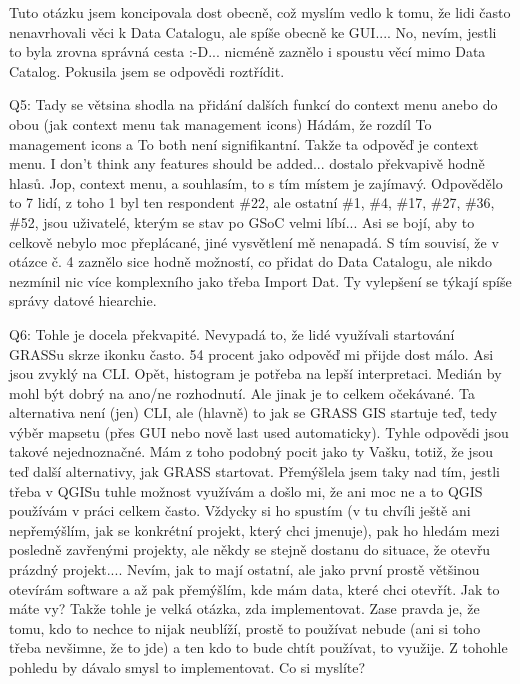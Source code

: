 \documentclass[a4paper,10pt,twoside]{article}
\begin{document}
 Tuto otázku jsem koncipovala dost obecně, což myslím vedlo k tomu, že lidi často nenavrhovali věci k Data Catalogu, ale spíše obecně ke GUI.... No, nevím, jestli to byla zrovna správná cesta :-D... nicméně zaznělo i spoustu věcí mimo Data Catalog. Pokusila jsem se odpovědi roztřídit.

    Q5: Tady se větsina shodla na přidání dalších funkcí do context menu anebo do obou (jak context menu tak management icons)
Hádám, že rozdíl To management icons a To both není signifikantní. Takže ta odpověď je context menu. I don't think any features should be added... dostalo překvapivě hodně hlasů.
Jop, context menu, a souhlasím, to s tím místem je zajímavý. Odpovědělo to 7 lidí, z toho 1 byl ten respondent \#22, ale ostatní \#1, \#4, \#17, \#27, \#36, \#52, jsou uživatelé, kterým se stav po GSoC velmi líbí... Asi se bojí, aby to celkově nebylo moc přeplácané, jiné vysvětlení mě nenapadá. S tím souvisí, že v otázce č. 4  zaznělo sice hodně možností, co přidat do Data Catalogu, ale nikdo nezmínil nic více komplexního jako třeba Import Dat. Ty vylepšení se týkají spíše správy datové hiearchie.

    Q6: Tohle je docela překvapité. Nevypadá to, že lidé využívali startování GRASSu skrze ikonku často. 54 procent jako odpověď mi přijde dost málo. Asi jsou zvyklý na CLI.
    Opět, histogram je potřeba na lepší interpretaci. Medián by mohl být dobrý na ano/ne rozhodnutí. Ale jinak je to celkem očekávané.
    Ta alternativa není (jen) CLI, ale (hlavně) to jak se GRASS GIS startuje teď, tedy výběr mapsetu (přes GUI nebo nově last used automaticky).
    Tyhle odpovědi jsou takové nejednoznačné. Mám z toho podobný pocit jako ty Vašku, totiž, že jsou teď další alternativy, jak GRASS startovat. Přemýšlela jsem taky nad tím, jestli třeba v QGISu tuhle možnost využívám a došlo mi, že ani moc ne a to QGIS používám v práci celkem často. Vždycky si ho spustím (v tu chvíli ještě ani nepřemýšlím, jak se konkrétní projekt, který chci jmenuje), pak ho hledám mezi posledně zavřenými projekty, ale někdy se stejně dostanu do situace, že otevřu prázdný projekt.... Nevím, jak to mají ostatní, ale jako první prostě většinou otevírám software a až pak přemýšlím, kde mám data, které chci otevřít. Jak to máte vy?
Takže tohle je velká otázka, zda implementovat. Zase pravda je, že tomu, kdo to nechce to nijak neublíží, prostě to používat nebude (ani si toho třeba nevšimne, že to jde) a ten kdo to bude chtít používat, to využije. Z tohohle pohledu by dávalo smysl to implementovat. Co si myslíte?
\end{document}
